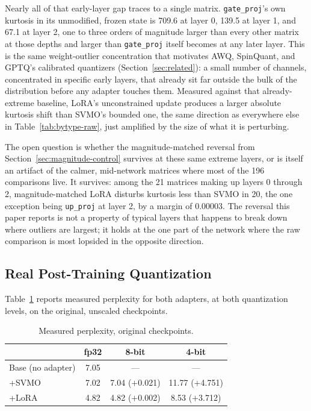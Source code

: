 \documentclass[conference]{IEEEtran}
\begin{document}
Nearly all of that early-layer gap traces to a single matrix. \texttt{gate\_proj}'s own kurtosis in its unmodified, frozen state is 709.6 at layer 0, 139.5 at layer 1, and 67.1 at layer 2, one to three orders of magnitude larger than every other matrix at those depths and larger than \texttt{gate\_proj} itself becomes at any later layer. This is the same weight-outlier concentration that motivates AWQ, SpinQuant, and GPTQ's calibrated quantizers (Section~\ref{sec:related}): a small number of channels, concentrated in specific early layers, that already sit far outside the bulk of the distribution before any adapter touches them. Measured against that already-extreme baseline, LoRA's unconstrained update produces a larger absolute kurtosis shift than SVMO's bounded one, the same direction as everywhere else in Table~\ref{tab:bytype-raw}, just amplified by the size of what it is perturbing.

The open question is whether the magnitude-matched reversal from Section~\ref{sec:magnitude-control} survives at these same extreme layers, or is itself an artifact of the calmer, mid-network matrices where most of the 196 comparisons live. It survives: among the 21 matrices making up layers 0 through 2, magnitude-matched LoRA disturbs kurtosis less than SVMO in 20, the one exception being \texttt{up\_proj} at layer 2, by a margin of 0.00003. The reversal this paper reports is not a property of typical layers that happens to break down where outliers are largest; it holds at the one part of the network where the raw comparison is most lopsided in the opposite direction.

\subsection{Real Post-Training Quantization}

Table~\ref{tab:quant} reports measured perplexity for both adapters, at both quantization levels, on the original, unscaled checkpoints.

\begin{table}[t]
\centering
\caption{Measured perplexity, original checkpoints.}
\label{tab:quant}
\begin{tabular}{@{}lccc@{}}
\toprule
 & fp32 & 8-bit & 4-bit \\
\midrule
Base (no adapter) & 7.05 & --- & --- \\
+SVMO & 7.02 & 7.04 ($+$0.021) & 11.77 ($+$4.751) \\
+LoRA & 4.82 & 4.82 ($+$0.002) & 8.53 ($+$3.712) \\
\bottomrule
\end{tabular}
\end{table}
\end{document}
